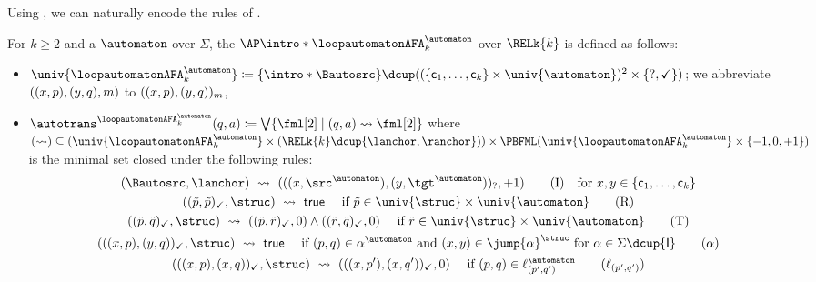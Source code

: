 \documentclass[a4paper,UKenglish,cleveref, autoref, thm-restate]{lipics-v2021}
\DeclarePairedDelimiter\set{\{}{\}}
\DeclarePairedDelimiter\tuple{(}{)}
\newcommand{\const}[1]{\mathsf{#1}}
\newcommand{\defeq}{\coloneq}
\newcommand{\id}{\const{I}}
\newcommand{\vsig}{\Sigma}
\begin{document}
Using , we can naturally encode the rules of .
\begin{defi}\label{definition: loop-automaton to 2AFA}
    For $k \ge 2$ and a  $\automaton$ over $\vsig$,
    the  $\AP\intro*\loopautomatonAFA_{k}^{\automaton}$ over $\RELk{k}$ is defined as follows:
    \begin{itemize}
        \item \AP $\univ{\loopautomatonAFA_{k}^{\automaton}} \defeq \set{\intro*\Bautosrc} \dcup ((\set{\const{c}_1, \dots, \const{c}_k} \times \univ{\automaton})^2 \times \set{?, \checkmark})$; we abbreviate $\tuple{\tuple{x, p}, \tuple{y, q}, m}$ to $\tuple{\tuple{x, p}, \tuple{y, q}}_{m}$,
        \item $\autotrans^{\loopautomatonAFA_{k}^{\automaton}}(q, a) \defeq \bigvee \set{\fml[2] \mid \tuple{q, a} \leadsto \fml[2]}$ where
        $(\leadsto) \subseteq (\univ{\loopautomatonAFA_{k}^{\automaton}} \times (\RELk{k} \dcup \set{\lanchor,\ranchor}))
        \times \PBFML(\univ{\loopautomatonAFA_{k}^{\automaton}} \times \set{-1, 0, +1})$ is the minimal set closed under the following rules:
        \begin{gather*}
        \tuple{\Bautosrc, \lanchor} ~\leadsto~ \tuple{\tuple{\tuple{x, \src^{\automaton}}, \tuple{y, \tgt^{\automaton}}}_{?}, +1} \tag{I} \quad \text{for $x,y \in \set{\const{c}_1, \dots, \const{c}_k}$}\\
            \tuple{\tuple{\tilde{p}, \tilde{p}}_{\checkmark}, \struc} ~\leadsto~ \const{true} \quad\text{ if $\tilde{p} \in \univ{\struc} \times \univ{\automaton}$} \tag{R}\\
            \tuple{\tuple{\tilde{p}, \tilde{q}}_{\checkmark}, \struc} ~\leadsto~ \tuple{\tuple{\tilde{p}, \tilde{r}}_{\checkmark}, 0} \land \tuple{\tuple{\tilde{r}, \tilde{q}}_{\checkmark}, 0} \quad\text{ if $\tilde{r} \in \univ{\struc} \times \univ{\automaton}$} \tag{T}\\
            \tuple{\tuple{\tuple{x, p}, \tuple{y, q}}_{\checkmark}, \struc} ~\leadsto~ \const{true} \quad\text{ if $\tuple{p, q} \in \alpha^{\automaton} \mbox{ and } \tuple{x, y} \in \jump{\alpha}^{\struc}$ for $\alpha \in \vsig \dcup \set{\id}$} \tag{$\alpha$}\\
            \tuple{\tuple{\tuple{x, p}, \tuple{x, q}}_{\checkmark}, \struc} ~\leadsto~ \tuple{\tuple{\tuple{x, p'}, \tuple{x, q'}}_{\checkmark},0} \quad\text{ if $\tuple{p, q} \in \ell_{\tuple{p', q'}}^{\automaton}$} \tag{$\ell_{\tuple{p', q'}}$}\\

\end{gather*}
\end{itemize}
\end{defi}
\end{document}
